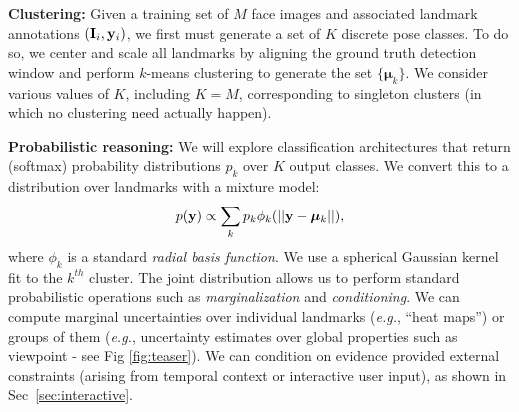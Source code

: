 \documentclass[letterpaper]{article} %
\newcommand{\eg}{\textit{e.g.}}
\newcommand{\ie}{\textit{i.e.}}
\begin{document}
{\bf Clustering:} Given a training set of $M$ face images and associated landmark annotations $({\bf I}_i, {\bf y}_i)$, we first must generate a set of $K$ discrete pose classes. To do so, we center and scale all landmarks by aligning the ground truth detection window and perform $k$-means clustering to generate the set $\{{\bm \mu}_k\}$.
We consider various values of $K$, including $K=M$, corresponding to singleton clusters (in which no clustering need actually happen).

{\bf Probabilistic reasoning:} We will explore classification architectures that return (softmax) probability distributions $p_k$ over $K$ output classes. We convert this to a distribution over landmarks with a mixture model:
\begin{align}
\label{eq:joint}
   p({\bf y}) \propto \sum_k  p_k \phi_k(||{\bf y}-{\bm \mu}_k||),
\end{align}
where $\phi_k$ is a standard {\em radial basis function}. We use a spherical Gaussian kernel fit to the $k^{th}$ cluster.  The joint distribution allows us to perform standard probabilistic operations such as {\em marginalization} and {\em conditioning}.  We can compute marginal uncertainties over individual landmarks (\eg, ``heat maps'') or groups of them (\eg, uncertainty estimates over global properties such as viewpoint - see Fig \ref{fig:teaser}). We can condition on evidence provided external constraints (arising from temporal context or interactive user input), as shown in Sec~\ref{sec:interactive}. %

\end{document}
